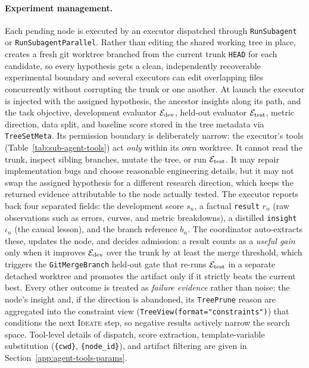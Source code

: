\paragraph{Experiment management.}
Each pending node is executed by an executor dispatched through
\texttt{RunSubagent} or \texttt{RunSubagentParallel}. Rather than editing the
shared working tree in place, \arbor{} creates a fresh git worktree branched
from the current trunk \texttt{HEAD} for each candidate, so every hypothesis gets
a clean, independently recoverable experimental boundary and several executors
can edit overlapping files concurrently without corrupting the trunk or one
another. At launch the executor is injected with the assigned hypothesis, the
ancestor insights along its path, and the task
objective, development evaluator $\mathcal{E}_{\mathrm{dev}}$, held-out evaluator $\mathcal{E}_{\mathrm{test}}$,
metric direction, data split, and baseline score stored in the tree metadata
via \texttt{TreeSetMeta}. Its permission boundary is deliberately narrow: the
executor's tools (Table~\ref{tab:sub-agent-tools}) act \emph{only} within its
own worktree. It cannot read the trunk, inspect sibling branches, mutate the
tree, or run $\mathcal{E}_{\mathrm{test}}$. It may repair implementation bugs and choose
reasonable engineering details, but it may not swap the assigned hypothesis for
a different research direction, which keeps the returned evidence attributable
to the node actually tested. The executor reports back four separated fields:
the development score $s_n$, a factual \texttt{result} $r_n$ (raw observations
such as errors, curves, and metric breakdowns), a distilled \texttt{insight}
$\iota_n$ (the causal lesson), and the branch reference $b_n$. The coordinator
auto-extracts these, updates the node, and decides admission: a result counts as
a \emph{useful gain} only when it improves $\mathcal{E}_{\mathrm{dev}}$ over the trunk by at
least the merge threshold, which triggers the \texttt{GitMergeBranch} held-out
gate that re-runs $\mathcal{E}_{\mathrm{test}}$ in a separate detached worktree and promotes the
artifact only if it strictly beats the current best. Every other outcome is
treated as \emph{failure evidence} rather than noise: the node's insight and, if
the direction is abandoned, its \texttt{TreePrune} reason are aggregated into
the constraint view (\texttt{TreeView(format="constraints")}) that conditions
the next \textsc{Ideate} step, so negative results actively narrow the search
space. Tool-level details of dispatch, score extraction, template-variable
substitution (\texttt{\{cwd\}}, \texttt{\{node\_id\}}), and artifact filtering
are given in Section~\ref{app:agent-tools-params}.

